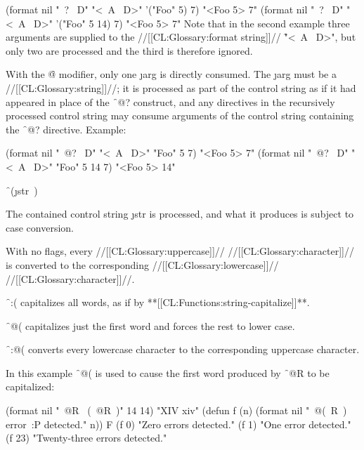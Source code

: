 \code
 (format nil "~? ~D" "<~A ~D>" '("Foo" 5) 7) \EV "<Foo 5> 7"
 (format nil "~? ~D" "<~A ~D>" '("Foo" 5 14) 7) \EV "<Foo 5> 7" \endcode Note that in the second example three arguments are supplied to the //[[CL:Glossary:format string]]// \f{"<~A ~D>"}, but only two are processed and the third is therefore ignored.

With the \f{@} modifier, only one \j{arg} is directly consumed. The \j{arg} must be a //[[CL:Glossary:string]]//;  it is processed as part of the control string as if it had appeared in place of the \f{~@?} construct, and any directives in the recursively processed control string may       consume arguments of the control string containing the \f{~@?} directive. Example:

\code
 (format nil "~@? ~D" "<~A ~D>" "Foo" 5 7) \EV "<Foo 5> 7"
 (format nil "~@? ~D" "<~A ~D>" "Foo" 5 14 7) \EV "<Foo 5> 14" \endcode

\endsubsubsection%

\endsubsection%


 

\f{~(\j{str}~)}

The contained control string \j{str} is processed, and what it produces is subject to case conversion.

With no flags, every //[[CL:Glossary:uppercase]]// //[[CL:Glossary:character]]// is converted to the corresponding //[[CL:Glossary:lowercase]]// //[[CL:Glossary:character]]//.

\f{~:(} capitalizes all words, as if by **[[CL:Functions:string-capitalize]]**.
                        

\f{~@(}  capitalizes just the first word and forces the rest to lower case.

\f{~:@(} converts every lowercase character to the corresponding uppercase character.

In this example \f{~@(} is used to cause the first word produced by \f{~@R} to be capitalized:

\code
 (format nil "~@R ~(~@R~)" 14 14)  \EV "XIV xiv"
 (defun f (n) (format nil "~@(~R~) error~:P detected." n)) \EV F
 (f 0) \EV "Zero errors detected."
 (f 1) \EV "One error detected."
 (f 23) \EV "Twenty-three errors detected." \endcode

